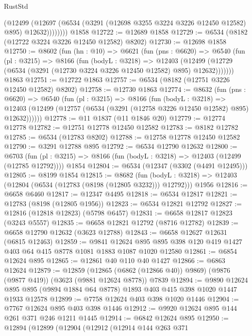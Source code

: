 \begin{lexlean}{RustStd}
\begin{coremodule}
              (@12499
                (@12697 (@6534 (@3291 (@12698 @3255 @3224 @3226 @12450 @12582) @895) @12632))))))))
    @1858
@12722 := @12689 @1858
@12729 := @6534 (@8182 (@12722 @3224 @3226 @12450 @12582) @8202)
@12730 := @12698 @1858
@12750 := @8602
    (fun (hn : @10) =>
    @6621
      (fun (pns : @6620) =>
      @6540
        (fun (pl : @3215) =>
        @8166
          (fun (bodyL : @3218) =>
          @12403
            (@12499 (@12729 (@6534 (@3291 (@12730 @3224 @3226 @12450 @12582) @895) @12632)))))))
    @1863
@12751 := @12722 @1863
@12757 := @6534 (@8182 (@12751 @3226 @12450 @12582) @8202)
@12758 := @12730 @1863
@12774 := @8632
    (fun (pns : @6620) =>
    @6540
      (fun (pl : @3215) =>
      @8166
        (fun (bodyL : @3218) =>
        @12403 (@12499 (@12757 (@6534 (@3291 (@12758 @3226 @12450 @12582) @895) @12632))))))
@12778 := @11 @1837 (@11 @1846 @20)
@12779 := @12774 @12778
@12782 := @12751 @12778 @12450 @12582
@12783 := @8182 @12782
@12785 := @6534 (@12783 @8202)
@12788 := @12758 @12778 @12450 @12582
@12790 := @3291 @12788 @895
@12792 := @6534 @12790 @12632
@12800 := @6703
    (fun (pl : @3215) => @8166 (fun (bodyL : @3218) => @12403 (@12499 (@12785 @12792))))
    @1854
@12804 := @6534 (@12347 (@3302 (@4491 @12495)))
@12805 := @8199 @1854
@12815 := @8682
    (fun (bodyL : @3218) => @12403 (@12804 (@6534 (@12783 (@8198 (@12805 @3232))) @12792)))
    @1956
@12816 := @6658 @6460
@12817 := @12347 @4495
@12818 := @6534 @12817
@12821 := @12783 (@8198 (@12805 @1956))
@12823 := @6534 @12821 @12792
@12827 := @12816 (@12818 @12823) (@5798 @6457)
@12831 := @6658 @12817 @12823 (@3243 @5557)
@12835 := @6658 @12821 @12792 (@8716 @12782)
@12839 := @6658 @12790 @12632 (@3623 @12788)
@12843 := @6658 @12627 @12631 (@6815 @12463)
@12859 := @9841
    @12624
    @895
    @895
    @398
    @120
    @419
    @1427
    @403
    @64
    @415
    @8778
    @1081
    @1883
    @1087
    @1020
    @12580
@12861 := @6854 @12624 @895
@12865 := @12861 @40 @110 @40 @1427
@12866 := @6863 @12624
@12879 := @12859
    (@12865 (@6862 (@12866 @40)) @9869)
    (@9876 (@9877 @419))
    (@3623 (@9881 @12624 @8778))
    @7839
@12894 := @9890
    @12624
    @895
    @895
    (@9894 @1884 @64 @8778)
    @1893
    @403
    @415
    @398
    @1020
    @1447
    @1933
    @12578
@12899 := @7758 @12624 @403 @398 @1020 @1446
@12904 := @7767 @12624 @895 @403 @398 @1446
@12912 := @9920 @12624 @895 @144 @261 @371 @246 @1211 @1445
@12914 := @6842 @12624 @895
@12950 := @12894
    (@12899
      (@12904
        (@12912
          (@12914
            @144
            @263
            @371

\end{coremodule}
\end{lexlean}
